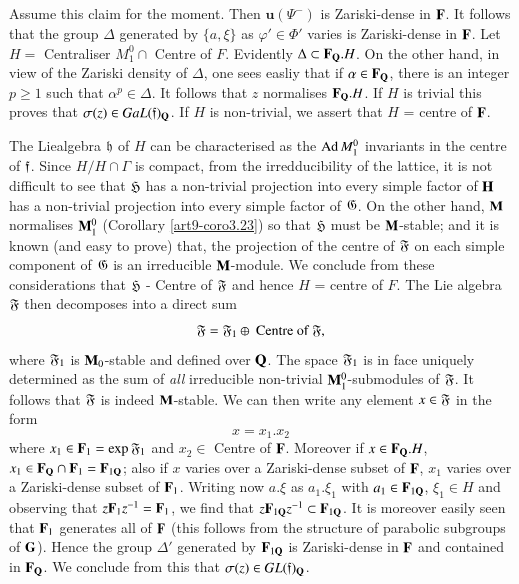 \subsection{}\label{art9-subsec3.28}
Assume this claim for the moment. Then $\textbf{u} (\Psi^{-})$ is Zariski-dense in $\mathbf{F}$. It follows that the group $\Delta$ generated by $\{a , \xi\}$ as $\varphi' \in \Phi'$ varies is Zariski-dense in $\mathbf{F}$. Let $H =$ Centraliser $M^0_1 \cap$  Centre of $F$. Evidently $\Delta \subset \mathbf{F}_{\mathbf{Q}}.H$. On the other hand, in view of the Zariski density of $\Delta$, one sees easliy that if $\alpha \in\mathbf{F}_{\mathbf{Q}}$, there is an integer $p \geq 1$ such that $\alpha^p \in\Delta$. It follows that $z$ normalises $\mathbf{F}_{\mathbf{Q}}.H$. If $H$ is trivial this proves that $\sigma (z) \in Ga L (\mathfrak{f})_{\mathbf{Q}}$. If $H$ is non-trivial, we assert that $H$ = centre of $\mathbf{F}$.

The Lie\pageoriginale algebra $\mathfrak{h}$ of $H$ can be characterised as the $\operatorname{Ad} M^0_1$ invariants in the centre of $\mathfrak{f}$. Since $H/H \cap \Gamma$ is compact, from the irredducibility of the lattice, it is not difficult to see that $\mathfrak{H}$ has a non-trivial projection into every simple factor of $\mathbf{H}$ has a non-trivial projection into every simple factor of $\mathfrak{G}$.  On the other hand, $\mathbf{M}$ normalises $\mathbf{M}^0_1$ (Corollary \ref{art9-coro3.23}) so that $\mathfrak{H}$ must be $\mathbf{M}$-stable; and it is known (and easy to prove) that, the projection of the centre of $\mathfrak{F}$ on each simple component of $\mathfrak{G}$ is an irreducible $\mathbf{M}$-module. We conclude from these considerations that $\mathfrak{H}$ - Centre of $\mathfrak{F}$ and hence $H$ = centre of $F$. The Lie algebra $\mathfrak{F}$ then decomposes into a direct sum
$$
\mathfrak{F} = \mathfrak{F}_1 \oplus \text{ Centre of } \mathfrak{F},
$$
where $\mathfrak{F}_1$ is $\mathbf{M}_0$-stable and defined over $\mathbf{Q}$. The space $\mathfrak{F}_1$ is in face uniquely determined as the sum of \textit{all} irreducible non-trivial $\mathbf{M}^0_1$-submodules of $\mathfrak{F}$. It follows that $\mathfrak{F}$ is indeed $\mathbf{M}$-stable. We can then write any element $x \in \mathfrak{F}$ in the form
$$
x = x_1. x_2
$$
where $x_1 \in \mathbf{F}_1 = \exp \mathfrak{F}_1$ and $x_2 \in $ Centre of $\mathbf{F}$. Moreover if $x \in \mathbf{F}_{\mathbf{Q}}. H$, $x_1 \in \mathbf{F}_{\mathbf{Q}} \cap \mathbf{F}_1 = \mathbf{F}_{1\mathbf{Q}}$; also if $x$ varies over a Zariski-dense subset of $\mathbf{F}$, $x_1$ varies over a Zariski-dense subset of $\mathbf{F}_1$. Writing now $a . \xi$ as $a_1 . \xi_1$ with $a_1 \in \mathbf{F}_{1\mathbf{Q}}$, $\xi_1 \in H$ and observing that $z \mathbf{F}_1 z^{-1} = \mathbf{F}_1$, we find that $z \mathbf{F}_{1\mathbf{Q}} z^{-1} \subset \mathbf{F}_{1\mathbf{Q}}$. It is moreover easily seen that $\mathbf{F}_1$ generates all of $\mathbf{F}$ (this follows from the structure of parabolic subgroups of $\mathbf{G}$). Hence the group $\Delta'$ generated by $\mathbf{F}_{1\mathbf{Q}}$ is Zariski-dense in $\mathbf{F}$ and contained in $\mathbf{F}_{\mathbf{Q}}$. We conclude from this that $\sigma (z) \in G L (\mathfrak{f})_{\mathbf{Q}}$.

